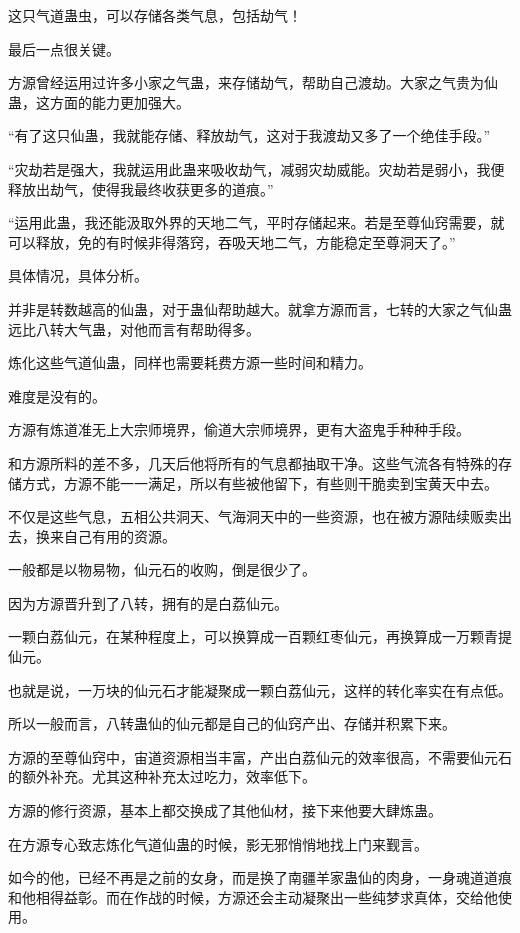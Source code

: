\begin{this_body}
这只气道蛊虫，可以存储各类气息，包括劫气！

最后一点很关键。

方源曾经运用过许多小家之气蛊，来存储劫气，帮助自己渡劫。大家之气贵为仙蛊，这方面的能力更加强大。

“有了这只仙蛊，我就能存储、释放劫气，这对于我渡劫又多了一个绝佳手段。”

“灾劫若是强大，我就运用此蛊来吸收劫气，减弱灾劫威能。灾劫若是弱小，我便释放出劫气，使得我最终收获更多的道痕。”

“运用此蛊，我还能汲取外界的天地二气，平时存储起来。若是至尊仙窍需要，就可以释放，免的有时候非得落窍，吞吸天地二气，方能稳定至尊洞天了。”

具体情况，具体分析。

并非是转数越高的仙蛊，对于蛊仙帮助越大。就拿方源而言，七转的大家之气仙蛊远比八转大气蛊，对他而言有帮助得多。

炼化这些气道仙蛊，同样也需要耗费方源一些时间和精力。

难度是没有的。

方源有炼道准无上大宗师境界，偷道大宗师境界，更有大盗鬼手种种手段。

和方源所料的差不多，几天后他将所有的气息都抽取干净。这些气流各有特殊的存储方式，方源不能一一满足，所以有些被他留下，有些则干脆卖到宝黄天中去。

不仅是这些气息，五相公共洞天、气海洞天中的一些资源，也在被方源陆续贩卖出去，换来自己有用的资源。

一般都是以物易物，仙元石的收购，倒是很少了。

因为方源晋升到了八转，拥有的是白荔仙元。

一颗白荔仙元，在某种程度上，可以换算成一百颗红枣仙元，再换算成一万颗青提仙元。

也就是说，一万块的仙元石才能凝聚成一颗白荔仙元，这样的转化率实在有点低。

所以一般而言，八转蛊仙的仙元都是自己的仙窍产出、存储并积累下来。

方源的至尊仙窍中，宙道资源相当丰富，产出白荔仙元的效率很高，不需要仙元石的额外补充。尤其这种补充太过吃力，效率低下。

方源的修行资源，基本上都交换成了其他仙材，接下来他要大肆炼蛊。

在方源专心致志炼化气道仙蛊的时候，影无邪悄悄地找上门来觐言。

如今的他，已经不再是之前的女身，而是换了南疆羊家蛊仙的肉身，一身魂道道痕和他相得益彰。而在作战的时候，方源还会主动凝聚出一些纯梦求真体，交给他使用。


\end{this_body}
